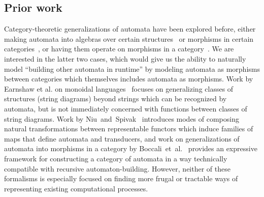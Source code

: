 \documentclass{article}
\theoremstyle{definition}
\theoremstyle{remark}
\begin{document}
\subsection{Prior work}
Category-theoretic generalizations of automata have been
explored before, either making
automata into algebras over certain
structures~\cite{adamekautomata} or morphisms in certain
categories~\cite{niu2023polynomial, boccali2023completeness}, or having
them operate on morphisms in a category~\cite{earnshaw2022regular,earnshaw2023string}.
We are interested in the latter two cases, which would give us
the ability to naturally model ``building other automata in runtime''
by modeling automata as morphisms between categories which themselves
includes automata as morphisms. Work by Earnshaw et al. on
monoidal languages~\cite{earnshaw2022regular,earnshaw2023string}
focuses on generalizing classes of structures
(string diagrams) beyond strings
which can be recognized by automata, but is not immediately
concerned with functions between classes of string diagrams.
Work by Niu~and~Spivak~\cite{niu2023polynomial} introduces
modes of composing natural transformations between representable
functors which induce families of maps that define
automata and transducers, and work on generalizations of
automata into morphisms in a category by 
Boccali~et~al.~\cite{boccali2023completeness} provides an
expressive framework for constructing a category of automata
in a way technically compatible with recursive automaton-building.
However, neither of these formalisms is especially focused on
finding more frugal or tractable ways of representing existing
computational processes.
\end{document}
